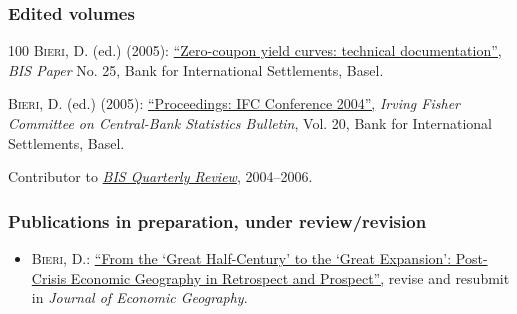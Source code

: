 \documentclass[letter,11pt]{article}
\begin{document}
\subsubsection*{Edited volumes}
\begingroup
\renewcommand{\section}[2]{}
\begin{thebibliography}{100}
\textsc{Bieri, D.} (ed.) (2005): \href{https://www.bis.org/publ/bppdf/bispap25.pdf}{\enquote{Zero-coupon yield curves: technical documentation},} \emph{BIS Paper} No. 25, Bank for International Settlements, Basel.

\textsc{Bieri, D.} (ed.) (2005): \href{https://www.bis.org/ifc/publ/ifcb20.pdf}{\enquote{Proceedings: IFC Conference 2004},} \emph{Irving Fisher Committee on Central-Bank Statistics Bulletin}, Vol. 20, Bank for International Settlements, Basel.

\noindent Contributor to \href{http://www.bis.org/publ/quarterly.htm}{\emph{BIS Quarterly Review}}, 2004--2006.

\end{thebibliography}
\endgroup


\subsubsection*{Publications in preparation, under review/revision}
\begin{itemize}[--]
\itemsep0em

\item \textsc{Bieri, D.}:  \href{https://www.researchgate.net/publication/332046717_From_the_'Great_Half-Century'_to_the_'Great_Expansion'_Post-Crisis_Economic_Geography_in_Retrospect_and_Prospect}{\enquote{From the \enquote{Great Half-Century} to the \enquote{Great Expansion}: Post-Crisis Economic Geography in Retrospect and Prospect},} revise and resubmit in \emph{Journal of Economic Geography}.
\end{itemize}

\end{document}
